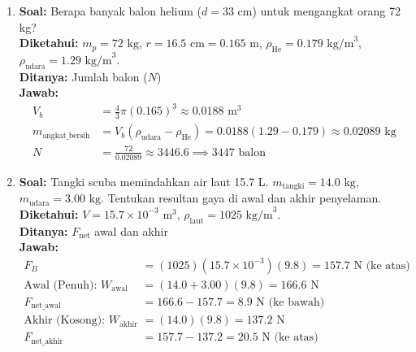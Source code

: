 \documentclass[twocolumn]{article}
\begin{document}
\begin{enumerate}
    \item \textbf{Soal:} Berapa banyak balon helium ($d = 33 \text{ cm}$) untuk mengangkat orang 72 kg? \\
    \textbf{Diketahui:} $m_p = 72 \text{ kg}$, $r = 16.5 \text{ cm} = 0.165 \text{ m}$, $\rho_{\text{He}} = 0.179 \text{ kg/m}^3$, $\rho_{\text{udara}} = 1.29 \text{ kg/m}^3$. \\
    \textbf{Ditanya:} Jumlah balon ($N$) \\
    \textbf{Jawab:}
    \begin{align*}
        V_b &= \frac{4}{3} \pi (0.165)^3 \approx 0.0188 \text{ m}^3 \\
        m_{\text{angkat\_bersih}} &= V_b (\rho_{\text{udara}} - \rho_{\text{He}}) = 0.0188 (1.29 - 0.179) \approx 0.02089 \text{ kg} \\
        N &= \frac{72}{0.02089} \approx 3446.6 \implies 3447 \text{ balon}
    \end{align*}

    \item \textbf{Soal:} Tangki scuba memindahkan air laut 15.7 L. $m_{\text{tangki}} = 14.0 \text{ kg}$, $m_{\text{udara}} = 3.00 \text{ kg}$. Tentukan resultan gaya di awal dan akhir penyelaman. \\
    \textbf{Diketahui:} $V = 15.7 \times 10^{-3} \text{ m}^3$, $\rho_{\text{laut}} = 1025 \text{ kg/m}^3$. \\
    \textbf{Ditanya:} $F_{\text{net}}$ awal dan akhir \\
    \textbf{Jawab:}
    \begin{align*}
        F_B &= (1025)(15.7 \times 10^{-3})(9.8) = 157.7 \text{ N (ke atas)} \\
        \text{Awal (Penuh): } W_{\text{awal}} &= (14.0 + 3.00)(9.8) = 166.6 \text{ N} \\
        F_{\text{net\_awal}} &= 166.6 - 157.7 = 8.9 \text{ N (ke bawah)} \\
        \text{Akhir (Kosong): } W_{\text{akhir}} &= (14.0)(9.8) = 137.2 \text{ N} \\
        F_{\text{net\_akhir}} &= 157.7 - 137.2 = 20.5 \text{ N (ke atas)}
    \end{align*}


\end{enumerate}
\end{document}
